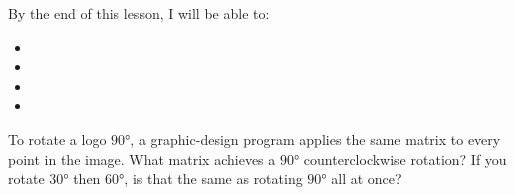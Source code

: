 \documentclass[10pt]{article}
\begin{document}
\namedateperiod

\vspace{0.08in}

\begin{objectivebox}
By the end of this lesson, I will be able to:
\begin{itemize}[leftmargin=1.5em, itemsep=3pt]
  \item \writeline
  \item \writeline
  \item \writeline
  \item \writeline
\end{itemize}
\end{objectivebox}

\vspace{0.06in}

\begin{vocabbox}
\end{vocabbox}

\vspace{0.06in}

\begin{hookbox}
To rotate a logo $90°$, a graphic-design program applies the same matrix to every point in
the image. What matrix achieves a $90°$ counterclockwise rotation? If you rotate $30°$ then $60°$,
is that the same as rotating $90°$ all at once?

\writeline
\end{hookbox}

\vspace{0.06in}
\end{document}
